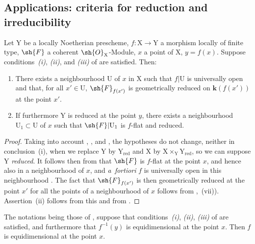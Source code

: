 \subsection{Applications: criteria for reduction and irreducibility}
\label{subsection:IV.15.3}

\begin{proposition}[15.3.1]
\label{IV.15.3.1}
Let $\mathrm{Y}$ be a locally Noetherian prescheme, $f:\mathrm{X}\to\mathrm{Y}$ a morphism locally of finite type, $\sh{F}$ a coherent $\sh{O}_\mathrm{X}$-Module, $x$ a point of $\mathrm{X}$, $y=f(x)$.
Suppose conditions~\emph{(i)}, \emph{(ii)}, and \emph{(iii)} of  are satisfied.
Then:
\begin{enumerate}[label=(\roman*)]
  \item There exists a neighbourhood $\mathrm{U}$ of $x$ in $\mathrm{X}$ such that $f|\mathrm{U}$ is universally open and that, for all $x'\in\mathrm{U}$, $\sh{F}_{f(x')}$ is geometrically reduced on $\mathbf{k}(f(x'))$ at the point $x'$.
  \item If furthermore $\mathrm{Y}$ is reduced at the point $y$, there exists a neighbourhood $\mathrm{U}_1\subset\mathrm{U}$ of $x$ such that $\sh{F}|\mathrm{U}_1$ is $f$-flat and reduced.
\end{enumerate}
\end{proposition}

\begin{proof}
\label{IV.15.3.1-proof}
Taking into account , , and , the hypotheses do not change, neither in conclusion~(i), when we replace $\mathrm{Y}$ by $\mathrm{Y}_\mathrm{red}$ and $\mathrm{X}$ by $\mathrm{X}\times_\mathrm{Y}\mathrm{Y}_\mathrm{red}$, so we can suppose $\mathrm{Y}$ \emph{reduced}.
It follows then from  that $\sh{F}$ is $f$-flat at the point $x$, and hence also  in a neighbourhood of $x$, and \emph{a~fortiori} $f$ is universally open in this neighbourhood .
The fact that $\sh{F}_{f(x')}$ is then geometrically reduced at the point $x'$ for all the points of a neighbourhood of $x$ follows from ,~(vii)).
Assertion~(ii) follows from this and from .
\end{proof}

\begin{proposition}[15.3.2]
\label{IV.15.3.2}
The notations being those of , suppose that conditions~\emph{(i)}, \emph{(ii)}, \emph{(iii)} of  are satisfied, and furthermore that $f^{-1}(y)$ is equidimensional at the point $x$.
Then $f$ is equidimensional at the point $x$.
\end{proposition}

